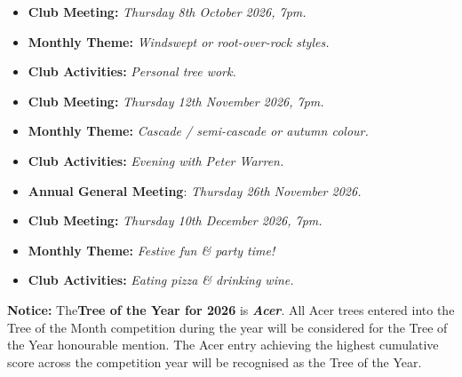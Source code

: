 \begin{itemize}
    \item \textbf{Club Meeting:} \textit{Thursday 8th October 2026, 7pm.}
    \item \textbf{Monthly Theme:} \textit{Windswept or root\--over\--rock styles.}
    \item \textbf{Club Activities:} \textit{Personal tree work.}
\end{itemize}

\begin{itemize}
    \item \textbf{Club Meeting:} \textit{Thursday 12th November 2026, 7pm.}
    \item \textbf{Monthly Theme:} \textit{Cascade / semi\--cascade or autumn colour.}
    \item \textbf{Club Activities:} \textit{Evening with Peter Warren.}
    \item \textbf{Annual General Meeting}: \textit{Thursday 26th November 2026.}
\end{itemize}

\begin{itemize}
    \item \textbf{Club Meeting:} \textit{Thursday 10th December 2026, 7pm.}
    \item \textbf{Monthly Theme:} \textit{Festive fun \& party time!}
    \item \textbf{Club Activities:} \textit{Eating pizza \& drinking wine.}
\end{itemize}

\noindent \textbf{Notice:} The\textbf{Tree of the Year for 2026} is \textbf{\textit{Acer}}. 
All Acer trees entered into the Tree of the Month competition during the year will be considered for the Tree of the Year honourable mention. 
The Acer entry achieving the highest cumulative score across the competition year will be recognised as the Tree of the Year.

\closearticle


\columnbreak
